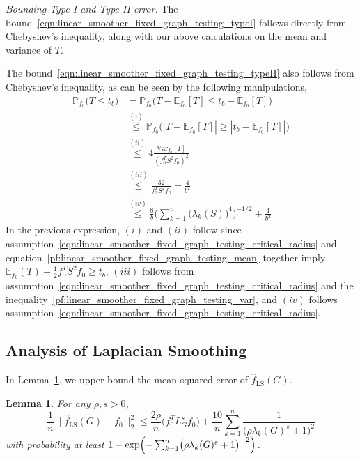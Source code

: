 \documentclass[twoside]{article}
\newcommand{\abs}[1]{\left \lvert #1 \right \rvert}
\newcommand{\Var}{\mathrm{Var}}
\newcommand{\1}{\mathbf{1}}
\newcommand{\Lap}{L}
\newcommand{\Pbb}{\mathbb{P}}
\newcommand{\Ebb}{\mathbb{E}}
\newcommand{\wh}[1]{\widehat{#1}}
\newcommand{\LS}{\mathrm{LS}}
\newtheorem{lemma}{Lemma}
\theoremstyle{definition}
\theoremstyle{remark}
\begin{document}
\textit{Bounding Type I and Type II error.} The bound~\eqref{eqn:linear_smoother_fixed_graph_testing_typeI} follows directly from Chebyshev's inequality, along with our above calculations on the mean and variance of $T$.

The bound~\eqref{eqn:linear_smoother_fixed_graph_testing_typeII} also follows from Chebyshev's inequality, as can be seen by the following manipulations,
\begin{equation*}
\begin{aligned}
\Pbb_{f_0}\bigl(T \leq t_b\bigr) & = \Pbb_{f_0}\bigl(T - \Ebb_{f_0}[T] \leq t_b - \Ebb_{f_0}[T]\bigr) \\
& \overset{(i)}{\leq} \Pbb_{f_0}\bigl(\abs{T - \Ebb_{f_0}[T]} \geq \abs{t_b - \Ebb_{f_0}[T]}\bigr) \\ 
& \overset{(ii)}{\leq} 4 \frac{\Var_{f_0}[T]}{(f_0^T S^2 f_0)^2} \\
& \overset{(iii)}{\leq} \frac{32}{f_0^T S^2 f_0} + \frac{4}{b^2} \\
& \overset{(iv)}{\leq} \frac{8}{b} \Biggl(\sum_{k = 1}^{n}\bigl(\lambda_k(S)\bigr)^4\Biggr)^{-1/2} + \frac{4}{b^2}
\end{aligned}
\end{equation*}
In the previous expression, $(i)$ and $(ii)$ follow since assumption~\eqref{eqn:linear_smoother_fixed_graph_testing_critical_radius} and equation~\eqref{pf:linear_smoother_fixed_graph_testing_mean} together imply $\Ebb_{f_0}(T) - \frac{1}{2}f_0^T S^2f_0 \geq t_b$, $(iii)$ follows from assumption~\eqref{eqn:linear_smoother_fixed_graph_testing_critical_radius} and the inequality~\eqref{pf:linear_smoother_fixed_graph_testing_var}, and $(iv)$ follows assumption~\eqref{eqn:linear_smoother_fixed_graph_testing_critical_radius}. 

\subsection{Analysis of Laplacian Smoothing}
In Lemma~\ref{lem:ls_fixed_graph_estimation}, we upper bound the mean squared error of $\wh{f}_{\LS}(G)$.
\begin{lemma}
	\label{lem:ls_fixed_graph_estimation}
	For any $\rho,s > 0$,
	\begin{equation}
	\label{eqn:ls_fixed_graph_estimation_prob}
	\frac{1}{n}\bigl\|\wh{f}_{\LS}(G) - f_0\bigr\|_2^2 \leq \frac{2\rho}{n} \bigl(f_0^T \Lap_{G}^s f_0\bigr) + \frac{10}{n}\sum_{k = 1}^{n} \frac{1}{\bigl(\rho \lambda_{k}(G)^s + 1\bigr)^2}
	\end{equation}
	with probability at least $1 - \exp\Bigl(-\sum_{k = 1}^{n}\bigl(\rho \lambda_k(G)^s + 1\bigr)^{-2}\Bigr)$.
\end{lemma}
\end{document}
